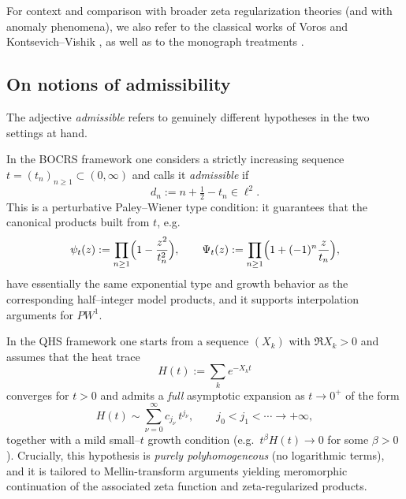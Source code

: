 \documentclass[11pt,letterpaper]{amsart}
\numberwithin{equation}{section}
\theoremstyle{definition}
\begin{document}
For context and comparison with broader zeta regularization theories (and
with anomaly phenomena), we also refer to the classical works of Voros and
Kontsevich--Vishik \cite{Voros87,KontsevichVishik1994_DeterminantsPsiDO}, as well as
to the monograph treatments \cite{JorgensonLang1993_RegularizedSeriesProducts,Paycha2012_RegularisedIntegralsSumsTraces,Kirsten2001_SpectralFunctions,ElizaldeEtAl1994_ZetaRegularization}.



\subsection{On notions of admissibility}
The adjective \emph{admissible} refers to genuinely different hypotheses in the two settings at hand.

In the BOCRS framework one considers a strictly increasing sequence
$t=(t_n)_{n\ge 1}\subset(0,\infty)$ and calls it \emph{admissible} if
\[
d_n := n+\tfrac12-t_n \in \ell^2.
\]
This is a perturbative Paley--Wiener type condition: it guarantees that the
canonical products built from $t$, e.g.
\[
\psi_t(z):=\prod_{n\ge 1}\Bigl(1-\frac{z^2}{t_n^2}\Bigr),
\qquad
\Psi_t(z):=\prod_{n\ge 1}\Bigl(1+(-1)^n\frac{z}{t_n}\Bigr),
\]
have essentially the same exponential type and growth behavior as the corresponding
half--integer model products, and it supports interpolation arguments
for $PW^1$.


In the QHS framework one starts from a sequence $(X_k)$ with $\Re X_k>0$ and assumes
that the heat trace
\[
H(t):=\sum_k e^{-X_k t}
\]
converges for $t>0$ and admits a \emph{full} asymptotic expansion as $t\to 0^+$ of the form
\[
H(t)\sim \sum_{\nu=0}^\infty c_{j_\nu}\,t^{j_\nu},
\qquad j_0<j_1<\cdots\to +\infty,
\]
together with a mild small--$t$ growth condition (e.g.\ $t^\beta H(t)\to 0$ for some
$\beta>0$).
Crucially, this hypothesis is \emph{purely polyhomogeneous} (no logarithmic terms),
and it is tailored to Mellin-transform arguments yielding meromorphic continuation of
the associated zeta function and zeta-regularized products.
\end{document}
